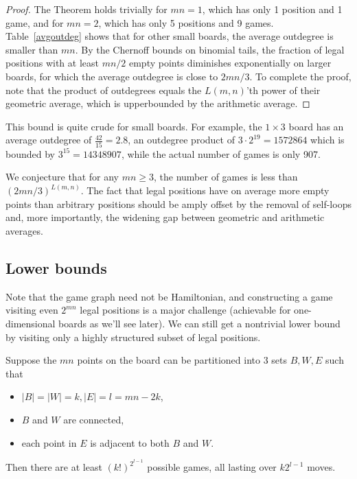 \documentclass{article}
\begin{document}
\begin{proof}
The Theorem holds trivially for $mn=1$, which has only 1 position and 1 game,
and for $mn=2$, which has only 5 positions and 9 games.
Table~\ref{avgoutdeg} shows that for other small boards,
the average outdegree is smaller than $mn$.
By the Chernoff bounds on binomial tails, the fraction of legal positions with
at least $mn/2$ empty points diminishes exponentially on larger boards, for
which the average outdegree is close to $2mn/3$.
To complete the proof, note that the product of outdegrees
equals the $L(m,n)$'th power of their geometric average, which
is upperbounded by the arithmetic average.
\end{proof}

This bound is quite crude for small boards. For example,
the $1 \times 3$ board has an average outdegree of $\frac{42}{15}=2.8$,
an outdegree product of $3\cdot 2^{19}=1572864$ which is bounded by
$3^{15}=14348907$, while the actual number of games is only 907.

We conjecture that for any $mn \geq 3$, the number of games is less than
$(2mn/3)^{L(m,n)}$.
The fact that legal positions have on average more empty points than
arbitrary positions should be amply offset by the removal
of self-loops and, more importantly, the widening gap between
geometric and arithmetic averages.

\subsection{Lower bounds}
Note that the game graph need not be Hamiltonian, and constructing
a game visiting even $2^{mn}$ legal positions is a major
challenge (achievable for one-dimensional boards as we'll see later).
We can still get a nontrivial lower bound by visiting only
a highly structured subset of legal positions.

\begin{theorem}
\label{partition}
Suppose the $mn$ points on the board can be partitioned
into 3 sets $B,W,E$ such that
\begin{itemize}
\item
$|B|=|W|=k, |E|=l=mn-2k$,
\item
$B$ and $W$ are connected,
\item
each point in $E$ is adjacent to both $B$ and $W$.
\end{itemize}
Then there are at least $(k!)^{2^{l-1}}$ possible games,
all lasting over $k{2^{l-1}}$ moves.
\end{theorem}
\end{document}
